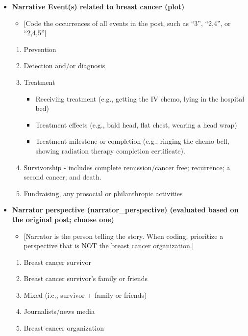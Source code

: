 \begin{itemize}
\tightlist
\item
  \textbf{Narrative Event(s) related to breast cancer (plot)}

  \begin{itemize}
  \tightlist
  \item
    {[}Code the occurrences of all events in the post, such as ``3'',
    ``2,4'', or ``2,4,5''{]}
  \end{itemize}

  \begin{enumerate}
  \def\labelenumi{\arabic{enumi}.}
  \tightlist
  \item
    Prevention
  \item
    Detection and/or diagnosis
  \item
    Treatment

    \begin{itemize}
    \tightlist
    \item
      Receiving treatment (e.g., getting the IV chemo, lying in the
      hospital bed)
    \item
      Treatment effects (e.g., bald head, flat chest, wearing a head
      wrap)
    \item
      Treatment milestone or completion (e.g., ringing the chemo bell,
      showing radiation therapy completion certificate).
    \end{itemize}
  \item
    Survivorship - includes complete remission/cancer free; recurrence;
    a second cancer; and death.
  \item
    Fundraising, any prosocial or philanthropic activities
  \end{enumerate}
\item
  \textbf{Narrator perspective (narrator\_perspective) (evaluated based
  on the original post; choose one)}

  \begin{itemize}
  \tightlist
  \item
    {[}Narrator is the person telling the story. When coding, prioritize
    a perspective that is NOT the breast cancer organization.{]}
  \end{itemize}

  \begin{enumerate}
  \def\labelenumi{\arabic{enumi}.}
  \tightlist
  \item
    Breast cancer survivor
  \item
    Breast cancer survivor's family or friends
  \item
    Mixed (i.e., survivor + family or friends)
  \item
    Journalists/news media
  \item
    Breast cancer organization
  \end{enumerate}
\end{itemize}

